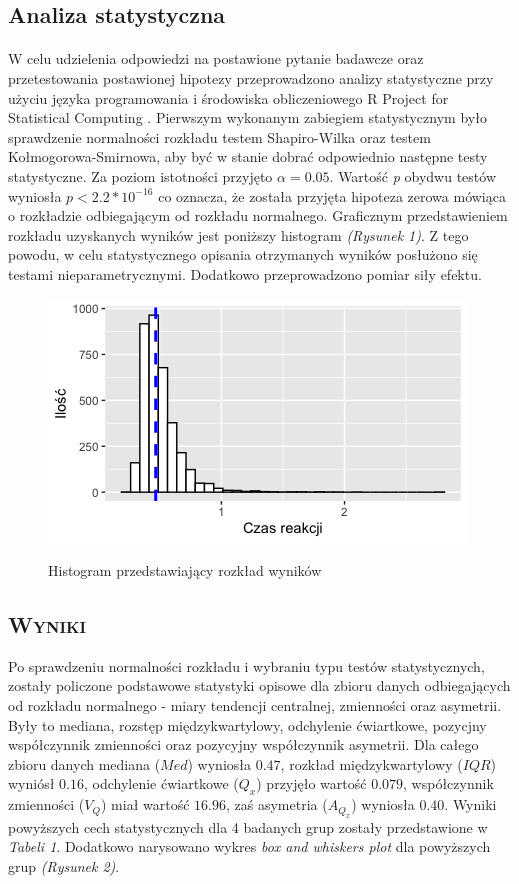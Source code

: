 \documentclass[12pt,a4paper,final,oneside,onecolumn,titlepage]{article}
\begin{document}
\subsection*{\normalsize{\textbf{Analiza statystyczna}}}
\paragraph{}
W celu udzielenia odpowiedzi na postawione pytanie badawcze oraz przetestowania postawionej hipotezy przeprowadzono analizy statystyczne przy użyciu języka programowania i środowiska obliczeniowego R Project for Statistical Computing \citep{r_core_team_r_2022}. Pierwszym wykonanym zabiegiem statystycznym było sprawdzenie normalności rozkładu testem Shapiro-Wilka oraz testem Kołmogorowa-Smirnowa, aby być w stanie dobrać odpowiednio następne testy statystyczne. Za poziom istotności przyjęto $\alpha = 0.05$. Wartość \textit{p} obydwu testów wyniosła $p < 2.2*10^{-16}$ co oznacza, że została przyjęta hipoteza zerowa mówiąca o rozkładzie odbiegającym od rozkładu normalnego. Graficznym przedstawieniem rozkładu uzyskanych wyników jest poniższy histogram \textit{(Rysunek 1)}. Z tego powodu, w celu statystycznego opisania otrzymanych wyników posłużono się testami nieparametrycznymi. Dodatkowo przeprowadzono pomiar siły efektu. 
\begin{figure}[h]
\centering
\caption{Histogram przedstawiający rozkład wyników}
\includegraphics[scale=1]{hist1}
\label{Rysunek}
\end{figure}
\begin{center}
\section*{\large{\textbf{\textsc{Wyniki}}}}
\end{center}
Po sprawdzeniu normalności rozkładu i wybraniu typu testów statystycznych, zostały policzone podstawowe statystyki opisowe dla zbioru danych odbiegających od rozkładu normalnego - miary tendencji centralnej, zmienności oraz asymetrii. Były to mediana, rozstęp międzykwartylowy, odchylenie ćwiartkowe, pozycjny współczynnik zmienności oraz pozycyjny współczynnik asymetrii. Dla całego zbioru danych mediana ($Med$) wyniosła $0.47$, rozkład międzykwartylowy ($IQR$) wyniósł $0.16$, odchylenie ćwiartkowe ($Q_x$) przyjęło wartość $0.079$, współczynnik zmienności ($V_Q$) miał wartość $16.96$, zaś asymetria ($A_{Q_{x}}$) wyniosła $0.40$. Wyniki powyższych cech statystycznych dla 4 badanych grup zostały przedstawione w \textit{Tabeli 1}. Dodatkowo narysowano wykres \textit{box and whiskers plot} dla powyższych grup \textit{(Rysunek 2)}.
\end{document}
